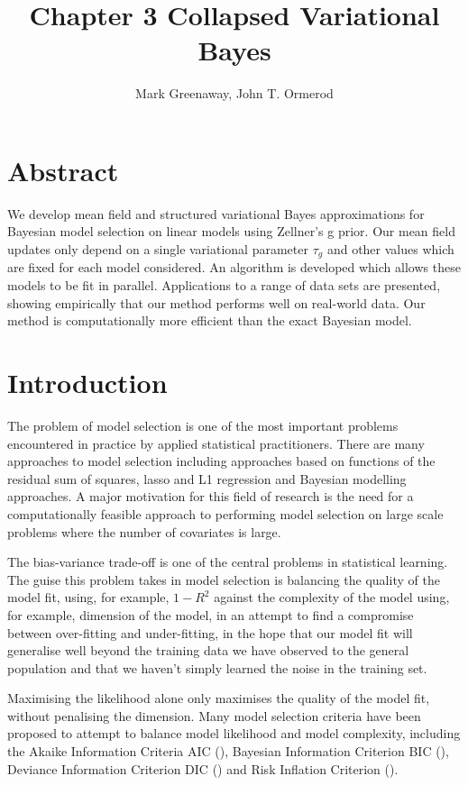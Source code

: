 \documentclass{amsart}[12pt]
\title{Chapter 3 Collapsed Variational Bayes}
\author{Mark Greenaway, John T. Ormerod}
\begin{document}
\maketitle

\section*{Abstract}


We develop mean field and structured variational Bayes approximations for Bayesian model selection on linear
models using Zellner's g prior. Our mean field updates only depend on a single variational parameter $\tau_g$
and other values which are fixed for each model considered. An algorithm is developed which allows these
models to be fit in parallel. Applications to a range of data sets are presented, showing  empirically that
our method performs well on real-world data. Our method is computationally more efficient  than the exact
Bayesian model.

\section{Introduction}

The problem of model selection is one of the most important problems encountered in practice by applied
statistical practitioners. There are many approaches to model selection including approaches based on
functions of the residual sum of squares, lasso and L1 regression and Bayesian modelling approaches. A major
motivation for this field of research is the need for a computationally feasible approach to performing model
selection on large scale problems where the number of covariates is large.

The bias-variance trade-off is one of the central problems in statistical learning. The guise this problem
takes in model selection is balancing the quality of the model fit, using, for example, $1 - R^2$ against the
complexity of the model using, for example, dimension of the model, in an attempt to find a compromise between
over-fitting and under-fitting, in the hope that our model fit will generalise well beyond the training data
we have observed to the general population and that we haven't simply learned the noise in the training set.

Maximising the likelihood alone only maximises the quality of the model fit, without penalising the dimension.
Many model selection criteria have been proposed to attempt to balance model likelihood and model complexity,
including the Akaike Information Criteria AIC (\cite{DeLeeuw1992}), Bayesian Information Criterion BIC
(\cite{Schwarz1978}), Deviance Information Criterion DIC (\cite{Spiegelhalter2016}) and Risk Inflation
Criterion (\cite{Foster1994}).
\end{document}
